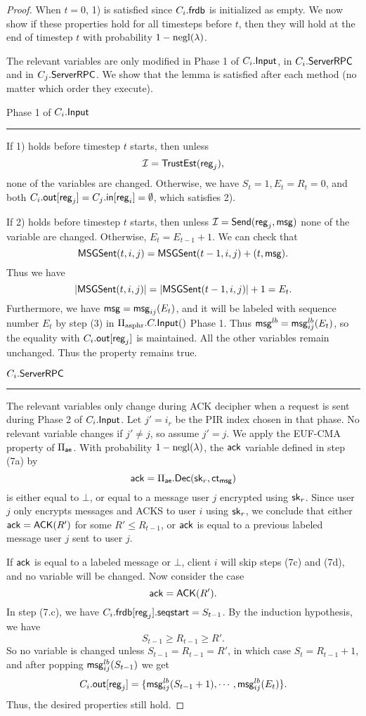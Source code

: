 \begin{proof}
When $t = 0$, 1) is satisfied since $C_i.\mathsf{frdb}$ is initialized as empty. We now show if these properties hold for all timesteps before $t$, then they will hold at the end of timestep $t$ with probability $1 - \operatorname{negl}(\lambda)$.

The relevant variables are only modified in Phase 1 of $C_i.\mathsf{Input}$, in $C_i.\mathsf{ServerRPC}$ and in $C_j.\mathsf{ServerRPC}$. We show that the lemma is satisfied after each method (no matter which order they execute).

Phase 1 of $C_i.\mathsf{Input}$
\hrule
If 1) holds before timestep $t$ starts, then unless 
$$\mathcal{I} = \mathsf{TrustEst}(\mathsf{reg}_j),$$
none of the variables are changed. Otherwise, we have $S_t = 1, E_t = R_t = 0$, and both $C_i.\mathsf{out}[\mathsf{reg}_j] = C_j.\mathsf{in}[\mathsf{reg}_i] = \emptyset$, which satisfies 2).

If 2) holds before timestep $t$ starts, then unless $\mathcal{I} = \mathsf{Send}(\mathsf{reg}_j, \mathsf{msg})$ none of the variable are changed. Otherwise, $E_t = E_{t - 1} + 1$. We can check that
$$\mathsf{MSGSent}(t, i, j) = \mathsf{MSGSent}(t - 1, i, j) + (t, \mathsf{msg}).$$
Thus we have
$$\left| \mathsf{MSGSent}(t, i, j) \right| = \left| \mathsf{MSGSent}(t - 1, i, j) \right| + 1 = E_t.$$
Furthermore, we have $\mathsf{msg} = \mathsf{msg}_{ij}(E_t)$, and it will be labeled with sequence number $E_t$ by step (3) in $\Pi_{\text{asphr}}.C.\mathsf{Input}()$ Phase 1. Thus $\mathsf{msg}^{lb} = \mathsf{msg}^{lb}_{ij}(E_t)$, so the equality with $C_i.\mathsf{out}[\mathsf{reg}_j]$ is maintained. All the other variables remain unchanged. Thus the property remains true.

\vspace{10pt}
$C_i.\mathsf{ServerRPC}$
\hrule
The relevant variables only change during ACK decipher when a request is sent during Phase 2 of $C_i.\mathsf{Input}$. Let $j' = i_r$ be the PIR index chosen in that phase. No relevant variable changes if $j' \neq j$, so assume $j' = j$. We apply the EUF-CMA property of $\Pi_{\mathsf{ae}}$. With probability $1 - \operatorname{negl}(\lambda)$, the $\mathsf{ack}$ variable defined in step (7a) by
$$\mathsf{ack} = \Pi_{\mathsf{ae}}.\mathsf{Dec}({\mathsf{sk}}_r, \mathsf{ct}_{\mathsf{msg}})$$
is either equal to $\bot$, or equal to a message user $j$ encrypted using ${\mathsf{sk}}_r$. Since user $j$ only encrypts messages and ACKS to user $i$ using ${\mathsf{sk}}_r$, we conclude that either $\mathsf{ack} = \mathsf{ACK}(R')$ for some $R' \leq R_{t - 1}$, or $\mathsf{ack}$ is equal to a previous labeled message user $j$ sent to user $j$. 

If $\mathsf{ack}$ is equal to a labeled message or $\bot$, client $i$ will skip steps (7c) and (7d), and no variable will be changed. Now consider the case
$$\mathsf{ack} = \mathsf{ACK}(R').$$
In step (7.c), we have $C_i.\mathsf{frdb}[\mathsf{reg}_j].\mathsf{seqstart} = S_{t - 1}$. By the induction hypothesis, we have
$$S_{t - 1} \geq R_{t - 1} \geq R'.$$
So no variable is changed unless $S_{t - 1} = R_{t - 1} = R'$, in which case $S_t = R_{t - 1} + 1$, and after popping $\mathsf{msg}^{lb}_{ij}(S_{t - 1})$ we get
$$C_i.\mathsf{out}[\mathsf{reg}_j] = \{\mathsf{msg}^{lb}_{ij}(S_{t - 1} + 1), \cdots, \mathsf{msg}^{lb}_{ij}(E_t)\}.$$
Thus, the desired properties still hold.


\end{proof}
